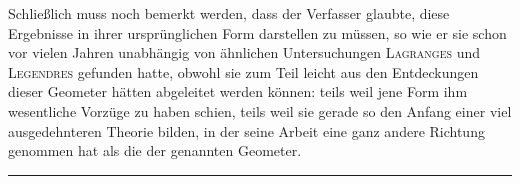 \par
Schließlich muss noch bemerkt werden, dass der Verfasser glaubte, diese Ergebnisse in ihrer ursprünglichen Form darstellen zu müssen, so wie er sie schon vor vielen Jahren unabhängig von ähnlichen Untersuchungen \textsc{Lagranges} und \textsc{Legendres} gefunden hatte, obwohl sie zum Teil leicht aus den Entdeckungen dieser Geometer hätten abgeleitet werden können: teils weil jene Form ihm wesentliche Vorzüge zu haben schien, teils weil sie gerade so den Anfang einer viel ausgedehnteren Theorie bilden, in der seine Arbeit eine ganz andere Richtung genommen hat als die der genannten Geometer.
\begin{center}\rule{0.25\linewidth}{0.4pt}\end{center}
\clearpage
\endgroup
